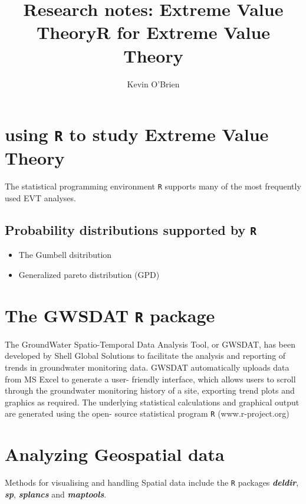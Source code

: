 \documentclass[12pt, a4paper]{article}
\title{Research notes: Extreme Value Theory}
\author{ } \date{ }
\theoremstyle{plain}
\theoremstyle{definition}
\theoremstyle{remark}
\begin{document}
\author{Kevin O'Brien}
\title{R for Extreme Value Theory}





\newpage
\section{using  \texttt{R}  to study Extreme Value Theory}
The statistical programming environment \texttt{R} supports many of the most frequently used EVT analyses.

\subsection{ Probability distributions supported by \texttt{R}}

\begin{itemize}
\item The Gumbell dsitribution
\item Generalized pareto distribution (GPD)
\end{itemize}





\section{The GWSDAT \texttt{R} package}
The GroundWater Spatio-Temporal Data Analysis Tool, or GWSDAT, has been
developed by Shell Global Solutions to facilitate the analysis and reporting of trends in groundwater monitoring
data. GWSDAT automatically uploads data from MS Excel to generate a user- friendly interface, which allows
users to scroll through the groundwater monitoring history of a site, exporting trend plots and graphics as required.
The underlying statistical calculations and graphical output are generated using the open- source statistical
program  \texttt{R} (www.r-project.org)
\section{Analyzing Geospatial data}
Methods for visualising and handling Spatial data include the \texttt{R} packages \textbf{\emph{deldir}},  \textbf{\emph{sp}},  \textbf{\emph{splancs}} and \textbf{\emph{ maptools}}.
\end{document}
